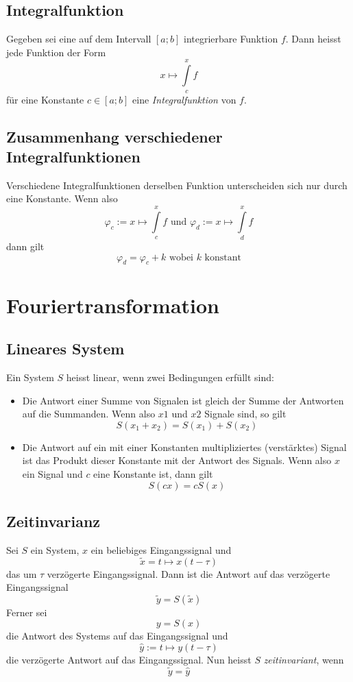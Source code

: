 \documentclass[10pt,a4paper]{scrartcl}
\begin{document}
\subsection{Integralfunktion}

Gegeben sei eine auf dem Intervall $[a;b]$ integrierbare Funktion $f$. Dann heisst
jede Funktion der Form
$$x \mapsto \int\limits_c^x f$$
für eine Konstante $c \in [a;b]$ eine \textit{Integralfunktion} von $f$.


\subsection{Zusammenhang verschiedener Integralfunktionen}

Verschiedene Integralfunktionen derselben Funktion unterscheiden sich nur durch
eine Konstante. Wenn also
$$\varphi_c := x \mapsto \int\limits_c^x f \textrm{ und } \varphi_d := x \mapsto
    \int\limits_d^x f$$
dann gilt
$$\varphi_d = \varphi_c + k \textrm{ wobei } k \textrm{ konstant}$$



\section{Fouriertransformation}


\subsection{Lineares System}

Ein System $S$ heisst linear, wenn zwei Bedingungen erfüllt sind:
\begin{itemize}
\item Die Antwort einer Summe von Signalen ist gleich der Summe der
Antworten auf die Summanden. Wenn also $x1$ und $x2$ Signale sind, so gilt
$$S(x_1 + x_2) = S(x_1) + S(x_2)$$
\item Die Antwort auf ein mit einer Konstanten multipliziertes
(verstärktes) Signal ist das Produkt dieser Konstante mit der Antwort
des Signals. Wenn also $x$ ein Signal und $c$ eine Konstante ist, dann gilt
$$S(cx) = cS(x)$$
\end{itemize}


\subsection{Zeitinvarianz}

Sei $S$ ein System, $x$ ein beliebiges Eingangssignal und
$$\tilde{x} = t \mapsto x(t - \tau)$$
das um $\tau$ verzögerte Eingangssignal. Dann ist die Antwort auf das verzögerte
Eingangssignal
$$\tilde{y} = S(\tilde{x})$$
Ferner sei
$$y = S(x)$$
die Antwort des Systems auf das Eingangssignal und
$$\hat{y} := t \mapsto y(t-\tau)$$
die verzögerte Antwort auf das Eingangssignal.
Nun heisst $S$ \textit{zeitinvariant}, wenn
$$\tilde{y} = \hat{y}$$
\end{document}
